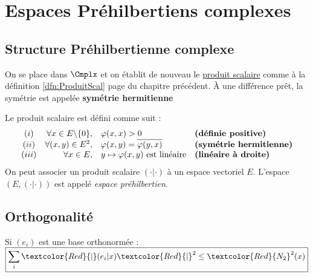 \documentclass[11pt,a4paper,fleqn,pdftex]{report}
\begin{document}
\chapter{Espaces Préhilbertiens complexes}
\section{Structure Préhilbertienne complexe}
On se place dans $\Cmplx$ et on établit de nouveau le \uline{produit scalaire} comme à la définition \ref{dfn:ProduitScal} page \pageref{dfn:ProduitScal} du chapitre précédent. À une différence prêt, la symétrie est appelée \textbf{symétrie hermitienne}
\begin{dfn}\label{dfn:ProduitScalCmplx}
Le produit scalaire  est défini comme suit : 
\[
\begin{array}{c r l l}
(i)&\forall x \in E\backslash \{ 0 \} , &{\varphi(x,x)>0}&\text{\textbf{(définie positive)}}\\
(ii)&\forall (x,y) \in E^2, &{\varphi (x,y) = \overline {\varphi (y,x)}} &\text{\textbf{(symétrie hermitienne)}}\\
(iii)&\forall x \in E, &{y \mapsto \varphi(x,y) \text{ est linéaire}}&\text{\textbf{(linéaire à droite)}}
\end{array}
\]
On peut associer un produit scalaire $(\cdot | \cdot )$ à un espace vectoriel $E$. L'espace $\left( E, (\cdot | \cdot ) \right)
$ est appelé \emph{espace préhilbertien}.
\end{dfn}
\section{Orthogonalité}
\begin{theorem}
Si $(e_i)$ est une base orthonormée : 
$\boxed{\sum_i \textcolor{Red}{|}(e_i|x)\textcolor{Red}{|}^2 \le \textcolor{Red}{N_2}^2 (x)}$
\end{theorem}
\end{document}
